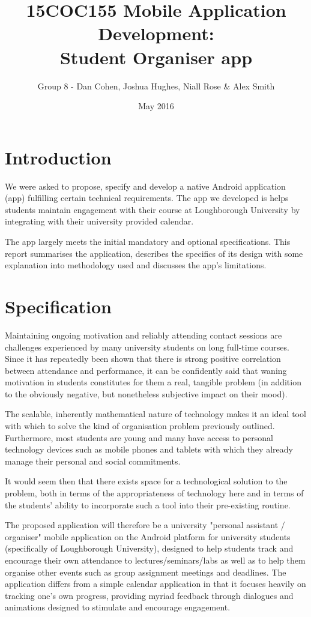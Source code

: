 \documentclass{article}
\title{15COC155 Mobile Application Development: \\
    Student Organiser app}
\author{Group 8 - Dan Cohen, Joshua Hughes, Niall Rose \& Alex Smith}
\date{May 2016}
\begin{document}
\maketitle

\tableofcontents
\newpage

\section{Introduction}
We were asked to propose, specify and develop a native Android application (app) fulfilling certain technical requirements. The app we developed is helps students maintain engagement with their course at Loughborough University by integrating with their university provided calendar.

The app largely meets the initial mandatory and optional specifications. This report summarises the application, describes the specifics of its design with some explanation into methodology used and discusses the app's limitations.

\section{Specification}
Maintaining ongoing motivation and reliably attending contact sessions are challenges experienced by many university students on long full-time courses. Since it has repeatedly been shown that there is strong positive correlation between attendance and performance, it can be confidently said that waning motivation in students constitutes for them a real, tangible problem (in addition to the obviously negative, but nonetheless subjective impact on their mood). 

The scalable, inherently mathematical nature of technology makes it an ideal tool with which to solve the kind of organisation problem previously outlined. Furthermore, most students are young and many have access to personal technology devices such as mobile phones and tablets with which they already manage their personal and social commitments. 

It would seem then that there exists space for a technological solution to the problem, both in terms of the appropriateness of technology here and in terms of the students' ability to incorporate such a tool into their pre-existing routine.

The proposed application will therefore be a university "personal assistant / organiser" mobile application on the Android platform for university students (specifically of Loughborough University), designed to help students track and encourage their own attendance to lectures/seminars/labs as well as to help them organise other events such as group assignment meetings and deadlines. The application differs from a simple calendar application in that it focuses heavily on tracking one's own progress, providing myriad feedback through dialogues and animations designed to stimulate and encourage engagement.
\end{document}
